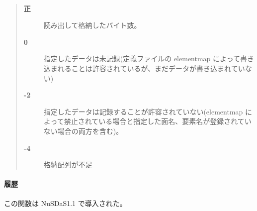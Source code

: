 \paragraph{\ResultCode}
\begin{quote}
\begin{description}
\item[{\bf 正}] 読み出して格納したバイト数。
\item[{\bf 0}] 指定したデータは未記録(定義ファイルの elementmap によって書き込まれることは許容されているが、まだデータが書き込まれていない)
\item[{\bf -2}] 指定したデータは記録することが許容されていない(elementmap によって禁止されている場合と指定した面名、要素名が登録されていない場合の両方を含む)。
\item[{\bf -4}] 格納配列が不足
\end{description}\end{quote}
\paragraph{ 履歴 }
この関数は NuSDaS1.1 で導入された。
